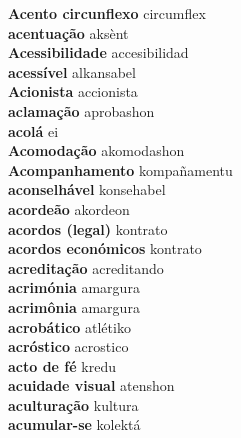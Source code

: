\textbf{ Acento circunflexo  } circumflex \\
\textbf{ acentuação  } aksènt \\
\textbf{ Acessibilidade  } accesibilidad \\
\textbf{ acessível  } alkansabel \\
\textbf{ Acionista  } accionista \\
\textbf{ aclamação  } aprobashon \\
\textbf{ acolá  } ei \\
\textbf{ Acomodação  } akomodashon \\
\textbf{ Acompanhamento  } kompañamentu \\
\textbf{ aconselhável  } konsehabel \\
\textbf{ acordeão  } akordeon \\
\textbf{ acordos (legal)  } kontrato \\
\textbf{ acordos económicos  } kontrato \\
\textbf{ acreditação  } acreditando \\
\textbf{ acrimónia  } amargura \\
\textbf{ acrimônia  } amargura \\
\textbf{ acrobático  } atlétiko \\
\textbf{ acróstico  } acrostico \\
\textbf{ acto de fé  } kredu \\
\textbf{ acuidade visual  } atenshon \\
\textbf{ aculturação  } kultura \\
\textbf{ acumular-se  } kolektá \\
